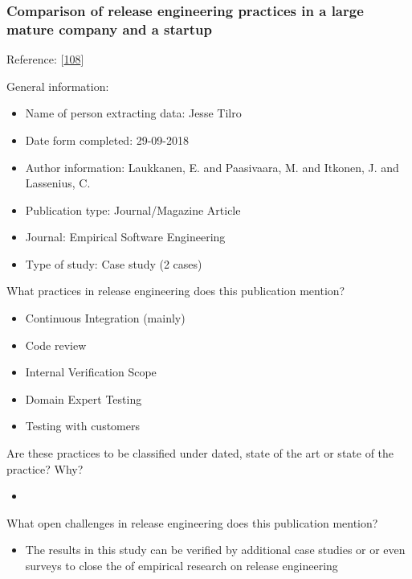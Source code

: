 \documentclass[]{book}
\providecommand{\tightlist}{%
  \setlength{\itemsep}{0pt}\setlength{\parskip}{0pt}}
\begin{document}
\subsubsection{Comparison of release engineering practices in a large
mature company and a
startup}\label{comparison-of-release-engineering-practices-in-a-large-mature-company-and-a-startup}

Reference: {[}\protect\hyperlink{ref-laukkanen2018a}{108}{]}

General information:

\begin{itemize}
\tightlist
\item
  Name of person extracting data: Jesse Tilro
\item
  Date form completed: 29-09-2018
\item
  Author information: Laukkanen, E. and Paasivaara, M. and Itkonen, J.
  and Lassenius, C.
\item
  Publication type: Journal/Magazine Article
\item
  Journal: Empirical Software Engineering
\item
  Type of study: Case study (2 cases)
\end{itemize}

What practices in release engineering does this publication mention?

\begin{itemize}
\tightlist
\item
  Continuous Integration (mainly)
\item
  Code review
\item
  Internal Verification Scope
\item
  Domain Expert Testing
\item
  Testing with customers
\end{itemize}

Are these practices to be classified under dated, state of the art or
state of the practice? Why?

\begin{itemize}
\item
\end{itemize}

What open challenges in release engineering does this publication
mention?

\begin{itemize}
\tightlist
\item
  The results in this study can be verified by additional case studies
  or or even surveys to close the of empirical research on release
  engineering
\end{itemize}
\end{document}
